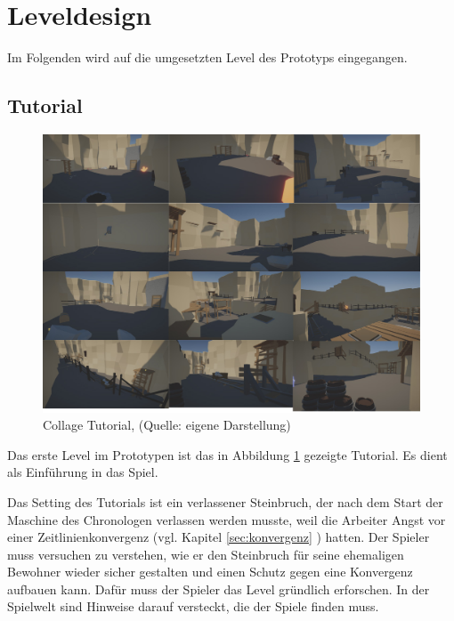 \section{Leveldesign}

Im Folgenden wird auf die umgesetzten Level des Prototyps eingegangen.

\subsection{Tutorial}

\begin{figure}[ht]
\centering
\includegraphics[width=1\linewidth]{content/pictures/Tutorial - A Fraction of Time.jpg}
\caption{Collage Tutorial, (Quelle: eigene Darstellung)}
\label{fig:collage_tutorial}
\end{figure}

Das erste Level im Prototypen ist das in Abbildung \ref{fig:collage_tutorial}  gezeigte Tutorial. Es dient als Einführung in das Spiel. 

Das Setting des Tutorials ist ein verlassener Steinbruch, der nach dem Start der Maschine des Chronologen verlassen werden musste, weil die Arbeiter Angst vor einer Zeitlinienkonvergenz (vgl. Kapitel \ref{sec:konvergenz} ) hatten. Der Spieler muss versuchen zu verstehen, wie er den Steinbruch für seine ehemaligen Bewohner wieder sicher gestalten und einen Schutz gegen eine Konvergenz aufbauen kann.
Dafür muss der Spieler das Level gründlich erforschen. In der Spielwelt sind Hinweise darauf versteckt, die der Spiele finden muss.

